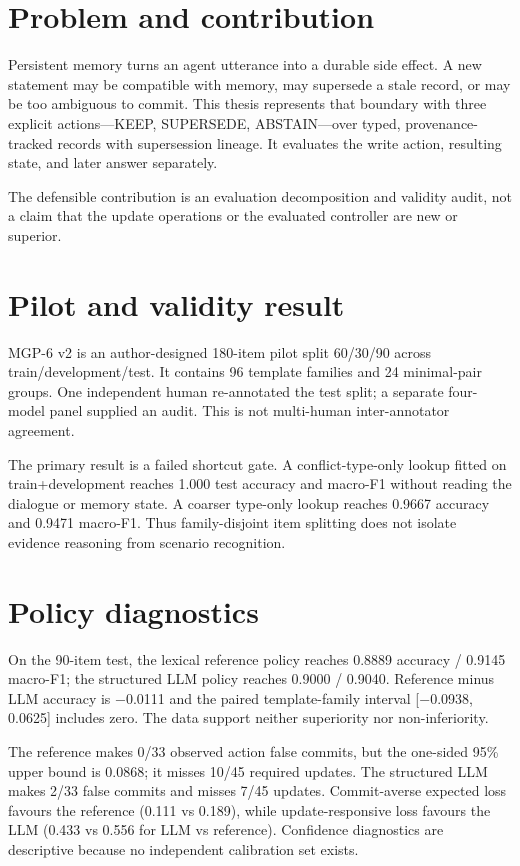 \section{Problem and contribution}\label{problem-and-contribution}

Persistent memory turns an agent utterance into a durable side effect. A
new statement may be compatible with memory, may supersede a stale
record, or may be too ambiguous to commit. This thesis represents that
boundary with three explicit actions---KEEP, SUPERSEDE, ABSTAIN---over
typed, provenance-tracked records with supersession lineage. It
evaluates the write action, resulting state, and later answer
separately.

The defensible contribution is an evaluation decomposition and validity
audit, not a claim that the update operations or the evaluated
controller are new or superior.

\section{Pilot and validity result}\label{pilot-and-validity-result}

MGP-6 v2 is an author-designed 180-item pilot split 60/30/90 across
train/development/test. It contains 96 template families and 24
minimal-pair groups. One independent human re-annotated the test split;
a separate four-model panel supplied an audit. This is not multi-human
inter-annotator agreement.

The primary result is a failed shortcut gate. A conflict-type-only
lookup fitted on train+development reaches 1.000 test accuracy and
macro-F1 without reading the dialogue or memory state. A coarser
type-only lookup reaches 0.9667 accuracy and 0.9471 macro-F1. Thus
family-disjoint item splitting does not isolate evidence reasoning from
scenario recognition.

\section{Policy diagnostics}\label{policy-diagnostics}

On the 90-item test, the lexical reference policy reaches 0.8889
accuracy / 0.9145 macro-F1; the structured LLM policy reaches 0.9000 /
0.9040. Reference minus LLM accuracy is −0.0111 and the paired
template-family interval {[}−0.0938, 0.0625{]} includes zero. The data
support neither superiority nor non-inferiority.

The reference makes 0/33 observed action false commits, but the
one-sided 95\% upper bound is 0.0868; it misses 10/45 required updates.
The structured LLM makes 2/33 false commits and misses 7/45 updates.
Commit-averse expected loss favours the reference (0.111 vs 0.189),
while update-responsive loss favours the LLM (0.433 vs 0.556 for LLM vs
reference). Confidence diagnostics are descriptive because no
independent calibration set exists.

